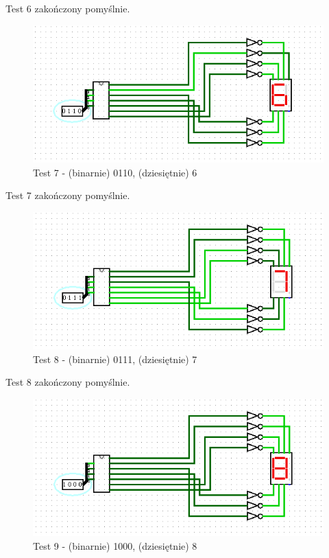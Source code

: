 Test 6 zakończony pomyślnie.

\begin{figure}[H]
    \includegraphics[width=\linewidth]{ScreenshotsTests/Comp 1/Comp 1_00003.png}
    \caption{Test 7 - (binarnie) 0110, (dziesiętnie) 6}
    \label{fig:test6}
\end{figure}

Test 7 zakończony pomyślnie.

\begin{figure}[H]
    \includegraphics[width=\linewidth]{ScreenshotsTests/Comp 1/Comp 1_00002.png}
    \caption{Test 8 - (binarnie) 0111, (dziesiętnie) 7}
    \label{fig:test7}
\end{figure}

Test 8 zakończony pomyślnie.

\begin{figure}[H]
    \includegraphics[width=\linewidth]{ScreenshotsTests/Comp 1/Comp 1_00001.png}
    \caption{Test 9 - (binarnie) 1000, (dziesiętnie) 8}
    \label{fig:test8}
\end{figure}

